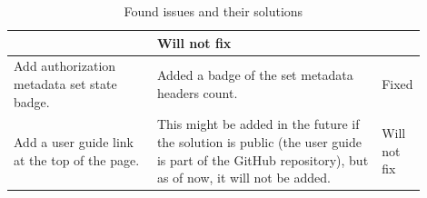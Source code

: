 \begin{table}[!htb]
{\begin{tabular}{|p{0.35\linewidth}|p{0.55\linewidth}|l|}
            & Will not fix \\
            \hline
            Add authorization metadata set state badge.
            & Added a badge of the set metadata headers count.
            & Fixed \\
            \hline
            Add a user guide link at the top of the page.
            & This might be added in the future if the solution is public (the user guide is part of the GitHub repository), but as of now, it will not be added.
            & Will not fix \\
            \hline
        \end{tabular}
    }
    \caption{Found issues and their solutions}
    \label{tab:user-testing-issues}
\end{table}


\newpage


